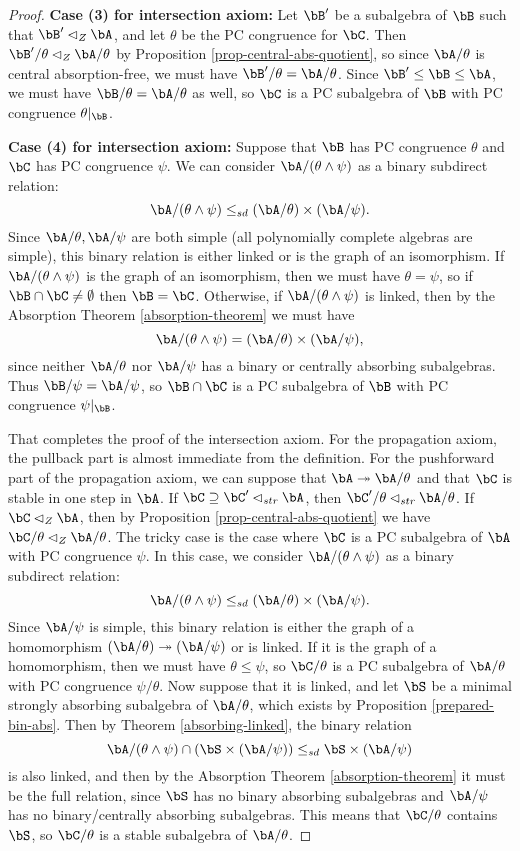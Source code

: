 \begin{proof}
{\bf Case (3) for intersection axiom:} Let $\bB'$ be a subalgebra of $\bB$ such that $\bB' \lhd_Z \bA$, and let $\theta$ be the PC congruence for $\bC$. Then $\bB'/\theta \lhd_Z \bA/\theta$ by Proposition \ref{prop-central-abs-quotient}, so since $\bA/\theta$ is central absorption-free, we must have $\bB'/\theta = \bA/\theta$. Since $\bB' \le \bB \le \bA$, we must have $\bB/\theta = \bA/\theta$ as well, so $\bC$ is a PC subalgebra of $\bB$ with PC congruence $\theta|_\bB$.

{\bf Case (4) for intersection axiom:} Suppose that $\bB$ has PC congruence $\theta$ and $\bC$ has PC congruence $\psi$. We can consider $\bA/(\theta \wedge \psi)$ as a binary subdirect relation:
\[
\bA/(\theta \wedge \psi) \le_{sd} (\bA/\theta) \times (\bA/\psi).
\]
Since $\bA/\theta, \bA/\psi$ are both simple (all polynomially complete algebras are simple), this binary relation is either linked or is the graph of an isomorphism. If $\bA/(\theta \wedge \psi)$ is the graph of an isomorphism, then we must have $\theta = \psi$, so if $\bB \cap \bC \ne \emptyset$ then $\bB = \bC$. Otherwise, if $\bA/(\theta \wedge \psi)$ is linked, then by the Absorption Theorem \ref{absorption-theorem} we must have
\[
\bA/(\theta \wedge \psi) = (\bA/\theta) \times (\bA/\psi),
\]
since neither $\bA/\theta$ nor $\bA/\psi$ has a binary or centrally absorbing subalgebras. Thus $\bB/\psi = \bA/\psi$, so $\bB \cap \bC$ is a PC subalgebra of $\bB$ with PC congruence $\psi|_\bB$.

That completes the proof of the intersection axiom. For the propagation axiom, the pullback part is almost immediate from the definition. For the pushforward part of the propagation axiom, we can suppose that $\bA \twoheadrightarrow \bA/\theta$ and that $\bC$ is stable in one step in $\bA$. If $\bC \supseteq \bC' \lhd_{str} \bA$, then $\bC'/\theta \lhd_{str} \bA/\theta$. If $\bC \lhd_Z \bA$, then by Proposition \ref{prop-central-abs-quotient} we have $\bC/\theta \lhd_Z \bA/\theta$. The tricky case is the case where $\bC$ is a PC subalgebra of $\bA$ with PC congruence $\psi$. In this case, we consider $\bA/(\theta \wedge \psi)$ as a binary subdirect relation:
\[
\bA/(\theta \wedge \psi) \le_{sd} (\bA/\theta) \times (\bA/\psi).
\]
Since $\bA/\psi$ is simple, this binary relation is either the graph of a homomorphism $(\bA/\theta) \twoheadrightarrow (\bA/\psi)$ or is linked. If it is the graph of a homomorphism, then we must have $\theta \le \psi$, so $\bC/\theta$ is a PC subalgebra of $\bA/\theta$ with PC congruence $\psi/\theta$. Now suppose that it is linked, and let $\bS$ be a minimal strongly absorbing subalgebra of $\bA/\theta$, which exists by Proposition \ref{prepared-bin-abs}. Then by Theorem \ref{absorbing-linked}, the binary relation
\[
\bA/(\theta \wedge \psi) \cap (\bS \times (\bA/\psi)) \le_{sd} \bS \times (\bA/\psi)
\]
is also linked, and then by the Absorption Theorem \ref{absorption-theorem} it must be the full relation, since $\bS$ has no binary absorbing subalgebras and $\bA/\psi$ has no binary/centrally absorbing subalgebras. This means that $\bC/\theta$ contains $\bS$, so $\bC/\theta$ is a stable subalgebra of $\bA/\theta$.


\end{proof}
